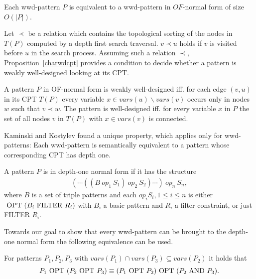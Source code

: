 \begin{proposition}\label{wwdtoofnf}
	Each wwd-pattern $P$ is equivalent to a wwd-pattern in $OF$-normal form of
	size $O(|P|)$.
\end{proposition}

Let $\prec$ be a relation which contains the topological sorting of the nodes in
$T(P)$ computed by a depth first search traversal. $v \prec u$ holds if $v$ is visited before
$u$ in the search process. Assuming such a relation $\prec$, Proposition~\ref{charwdcpt} 
provides a condition to decide whether a pattern is weakly well-designed looking
at its CPT.

\begin{proposition}\label{charwdcpt}
	A pattern $P$ in OF-normal form is weakly well-designed iff. for each edge
	$(v,u)$ in its CPT $T(P)$ every variable $x \in vars(u) \backslash vars(v)$
	occurs only in nodes $w$ such that $v \prec w$. The pattern is well-designed
	iff. for every variable $x$ in $P$ the set of all nodes $v$ in $T(P)$ with
	$x \in vars(v)$ is connected.
\end{proposition}

Kaminski and Kostylev found a unique property, which applies only for
wwd-patterns: Each wwd-pattern is semantically equivalent to a pattern whose corresponding
CPT has depth one.
\begin{definition}
	A pattern $P$ is in depth-one normal form if it has the structure
	\begin{align*}
		(\cdots((B \ op_1 \ S_1) \ op_2 \ S_2) \cdots)\ op_n \ S_n,
	\end{align*}
	where $B$ is a set of triple patterns and each $op_i S_i, 1 \leq i \leq n$ is either
	$\mbox{ OPT } (B_i \mbox{ FILTER } R_i)$ with $B_i$ a basic pattern and $R_i$ a filter
	constraint, or just FILTER $R_i$.
\end{definition}

Towards our goal to show that every wwd-pattern can be brought to the depth-one
normal form the following equivalence can be used.
\begin{proposition}\label{equivdep1}
	For patterns $P_1, P_2,P_3$ with $vars(P_1) \cap vars(P_3) \subseteq
	vars(P_2)$ it holds that 
	\begin{align*}
		P_1 \mbox{ OPT } (P_2 \mbox{ OPT } P_3) \equiv (P_1 \mbox{ OPT } P_2) \mbox{ OPT } (P_2 \mbox{ AND } P_3).
	\end{align*}
\end{proposition}

